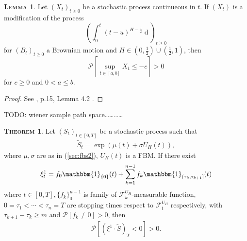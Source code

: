 \documentclass[a4paper, twoside, 11pt]{article}
\theoremstyle{definition}
\newtheorem{theorem}[definition]{\scshape Theorem}
\newtheorem{lemma}[definition]{\scshape Lemma}
\newcommand{\brkt}[1]{\left({#1} \right)}
\begin{document}
\begin{lemma}
  Let $(X_t)_{t\ge 0}$ be a stochastic process continueous in $t$. If $(X_t)$ is a modification of the process 
  $$
  \brkt{\int_0^t (t-u)^{H-\frac{1}{2}}\mathop{dB_u}}_{t\ge 0}
  $$
  for $(B_t)_{t\ge 0}$ a Brownian motion and $H\in (0, \frac{1}{2})\cup(\frac{1}{2}, 1)$,
  then 
  $$
  \mathcal{P}[\sup\limits_{t\in[a,b]} X_t \le -c] > 0
  $$
  for $c \ge 0$ and $0< a\le b$.
  \label{sec:lll} 
\end{lemma}

\begin{proof}
  See \cite{chridito}, p.15, Lemma 4.2 .
\end{proof}
TODO: wiener sample path space\dots\dots\dots\dots
\begin{theorem}
  Let $(S_t)_{t\in[0, T]}$ be a stochastic process such that
  \begin{eqnarray}
	\tilde{S}_t = \exp\brkt{\mu(t) + \sigma U_H(t)},
	\label{sec:fbs}
  \end{eqnarray}
  where $\mu, \sigma$ are as in (\ref{sec:fbs2}), $U_H(t)$ is a FBM. If there exist
  \begin{eqnarray*}
  \xi^1_t = f_0\mathbbm{1}_{\{0\}}(t)+\sum_{k=1}^{n-1} f_k \mathbbm{1}_{(\tau_k, \tau_{k+1}]}(t)
  \end{eqnarray*}
  where $t\in[0, T], \{f_k\}_0^{n-1}$ is family of  $\mathcal{F}^{U_H}_k $-measurable function, $0 = \tau_1 < \cdots <\tau_n = T$ are stopping times respect to $\mathcal{F}^{U_H}_t $ respectively,  with $\tau_{k+1} - \tau_k\ge m$ and $\mathcal{P}[f_k\neq 0]>0$, then
  \begin{eqnarray*}
	\mathcal{P}[(\xi^1 \cdot \tilde{S})_T < 0] > 0.
	\label{sec:claim}
  \end{eqnarray*}
\end{theorem}
\end{document}
